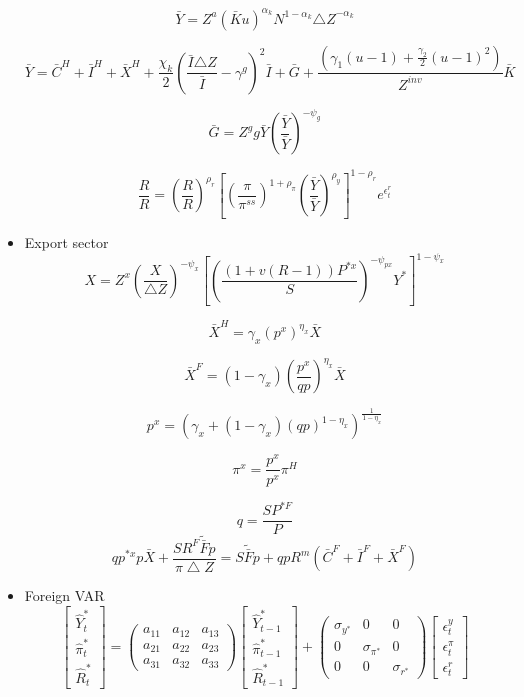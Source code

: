 \documentclass[11pt, a4paper]{article}
\begin{document}
\begin{itemize}
\[\bar{Y} = Z^a (\bar{K}u)^{\alpha_k}N^{1-\alpha_k} {\bigtriangleup Z}^{-\alpha_k}\]

\[\bar{Y} = \bar{C}^H + \bar{I}^H + \bar{X}^H + \frac{\chi_k}{2}\left( \frac{\bar{I} {\bigtriangleup Z}}{\bar{I}} -\gamma^g \right)^2\bar{I}+ \bar{G} + \frac{\left(\gamma_1(u -1) + \frac{\gamma_2}{2}(u -1)^2\right)}{Z^{inv}} \bar{K}\]


\[\bar{G} = Z^g g\bar{Y}\left( \frac{\bar{Y}}{\bar{Y}} \right)^{-\psi_g}\]

\[ \frac{R}{{R}} = \left( \frac{R}{{R}} \right) ^{\rho_r} \left[ \left(\frac{\pi}{{\pi}^{ss}} \right)^{1+\rho_{\pi}} \left(\frac{\bar{Y}}{\bar{Y}} \right)^{\rho_{y}} \right]^{1-\rho_r}e^{\epsilon_t^r} \]

\item Export sector
\[X = Z^x \left(\frac{X} {\bigtriangleup Z} \right)^{-\psi_x}\left[\left( \frac{(1+v(R-1))P^{*x}}{S} \right)^{-\psi_{px}}Y^* \right]^{1-\psi_x}\]

\[\bar{X}^H = \gamma_x (p^x)^{\eta_x} \bar{X}\]

\[\bar{X}^F = (1-\gamma_x) \left( \frac{p^{x}}{q p} \right)^{\eta_x}\bar{X}\]

\[ p^x = \left(\gamma_x + (1-\gamma_x)(q p)^{1-\eta_x}\right)^{\frac{1}{1-\eta_x}}\]

\[\pi^x = \frac{p^x}{p^x}\pi^H\]

\[ q = \frac{S P^{*F}} {P}  \]
\[
 {q p^{*x}p\bar{X}} + \frac{S R^F \tilde{\bar{F}}p}{ \pi \bigtriangleup Z} = {S \tilde{\bar{F}} p} + {q p R^m }(\bar{C}^F + \bar{I}^F + \bar{X}^F)
\]

\item Foreign VAR
\begin{equation} \begin{bmatrix} \widehat{Y}_t^* \\ \widehat{\pi}_t^* \\ \widehat{R}_t^* \end{bmatrix} = 
\begin{pmatrix}
a_{11} & a_{12} & a_{13} \\
a_{21} & a_{22} & a_{23} \\
a_{31} & a_{32} & a_{33} 
\end{pmatrix} 
\begin{bmatrix} \widehat{Y}_{t-1}^* \\ \widehat{\pi}_{t-1}^* \\ \widehat{R}_{t-1}^* \end{bmatrix}
+ \begin{pmatrix}
\sigma_{y^*} & 0 & 0 \\
0 & \sigma_{\pi^*} & 0 \\
0 & 0 & \sigma_{r^*} 
\end{pmatrix} \begin{bmatrix}
\epsilon_t^y \\
\epsilon_t^{\pi} \\
\epsilon_t^r 
\end{bmatrix} \end{equation}


\end{itemize}
\pagebreak
\end{document}
